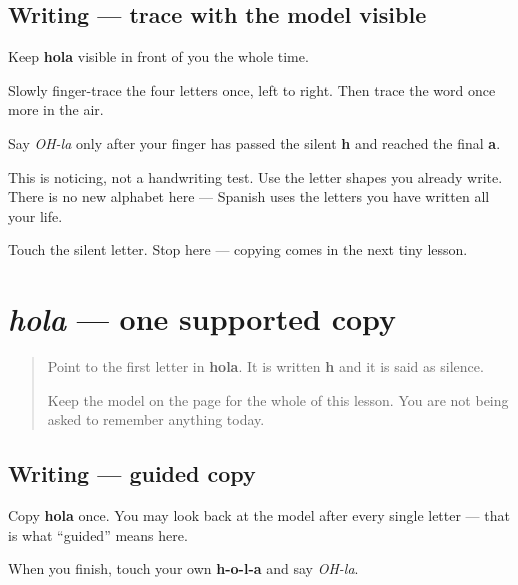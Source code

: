 \subsection*{Writing — trace with the model visible}

Keep \textbf{hola} visible in front of you the whole time.

Slowly finger-trace the four letters once, left to right. Then trace the word once more in the air.

Say \emph{OH-la} only after your finger has passed the silent \textbf{h} and reached the final \textbf{a}.

This is noticing, not a handwriting test. Use the letter shapes you already write. There is no new alphabet here — Spanish uses the letters you have written all your life.

\begin{tcolorbox}[breakable,colback=teal!4,colframe=teal!35!black,title={Before you move on}]
Touch the silent letter. Stop here — copying comes in the next tiny lesson.
\end{tcolorbox}
\section[hola]{\emph{hola} — one supported copy}

\label{lesson:ES-W00-hola-guided-copy}



\begin{quote}
Point to the first letter in \textbf{hola}. It is written \textbf{h} and it is said as silence.

Keep the model on the page for the whole of this lesson. You are not being asked to remember anything today.
\end{quote}

\subsection*{Writing — guided copy}

Copy \textbf{hola} once. You may look back at the model after every single letter — that is what \textquotedblleft{}guided\textquotedblright{} means here.

When you finish, touch your own \textbf{h-o-l-a} and say \emph{OH-la}.

